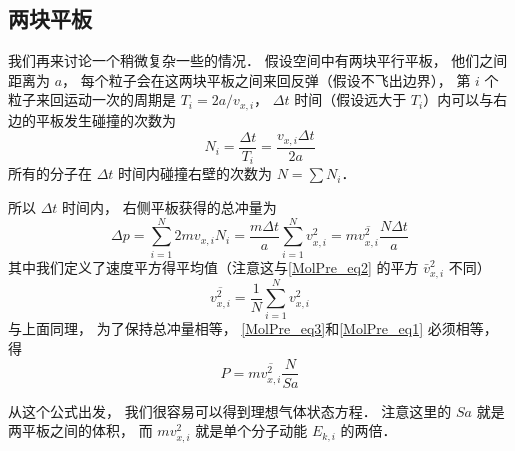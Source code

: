 \subsection{两块平板}
我们再来讨论一个稍微复杂一些的情况． 假设空间中有两块平行平板， 他们之间距离为 $a$， 每个粒子会在这两块平板之间来回反弹（假设不飞出边界）， 第 $i$ 个粒子来回运动一次的周期是 $T_i = 2a/v_{x,i}$， $\Delta t$ 时间（假设远大于 $T_i$）内可以与右边的平板发生碰撞的次数为
\begin{equation}
N_i = \frac{\Delta t}{T_i} = \frac{v_{x,i} \Delta t}{2a}
\end{equation}
所有的分子在 $\Delta t$ 时间内碰撞右壁的次数为 $N = \sum N_i$．

所以 $\Delta t$ 时间内， 右侧平板获得的总冲量为
\begin{equation}\label{MolPre_eq3}
\Delta p = \sum_{i=1}^N 2mv_{x,i} N_i = \frac{m \Delta t}{a} \sum_{i=1}^N v_{x,i}^2 = m\overline {v_{x,i}^2} \frac{ N\Delta t}{a}
\end{equation}
其中我们定义了速度平方得平均值（注意这与\autoref{MolPre_eq2} 的平方 $\bar v_{x,i}^2$ 不同）
\begin{equation}
\overline {v_{x,i}^2} = \frac{1}{N} \sum_{i=1}^N v_{x,i}^2
\end{equation}
与上面同理， 为了保持总冲量相等， \autoref{MolPre_eq3}和\autoref{MolPre_eq1} 必须相等， 得
\begin{equation}\label{MolPre_eq4}
P = m \overline {v_{x,i}^2} \frac{N}{Sa}
\end{equation}

从这个公式出发， 我们很容易可以得到理想气体状态方程． 注意这里的 $Sa$ 就是两平板之间的体积， 而 $mv_{x,i}^2$ 就是单个分子动能 $E_{k,i}$ 的两倍．
